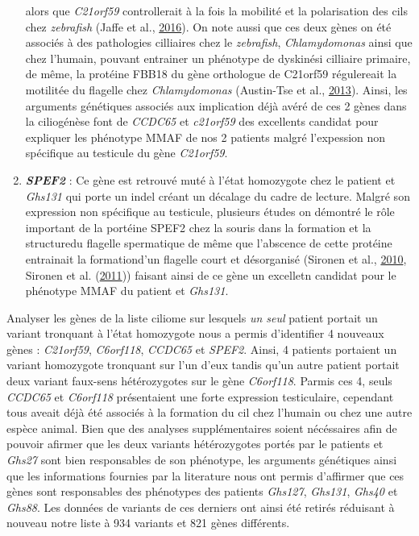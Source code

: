 \documentclass[12pt,twoside]{reedthesis}
\theoremstyle{definition}
\theoremstyle{definition}
\theoremstyle{remark}
\begin{document}
\begin{enumerate}
    alors que \emph{C21orf59} controllerait à la fois la mobilité et la
    polarisation des cils chez \emph{zebrafish} (Jaffe et al.,
    \protect\hyperlink{ref-Jaffe2016}{2016}). On note aussi que ces deux
    gènes on été associés à des pathologies cilliaires chez le
    \emph{zebrafish}, \emph{Chlamydomonas} ainsi que chez l'humain,
    pouvant entrainer un phénotype de dyskinési cilliaire primaire, de
    même, la protéine FBB18 du gène orthologue de C21orf59 régulereait la
    motilitée du flagelle chez \emph{Chlamydomonas} (Austin-Tse et al.,
    \protect\hyperlink{ref-Austin-Tse2013}{2013}). Ainsi, les arguments
    génétiques associés aux implication déjà avéré de ces 2 gènes dans la
    ciliogénèse font de \emph{CCDC65} et \emph{c21orf59} des excellents
    candidat pour expliquer les phénotype MMAF de nos 2 patients malgré
    l'expession non spécifique au testicule du gène \emph{C21orf59}.
  \item
    \textbf{\emph{SPEF2}} : Ce gène est retrouvé muté à l'état homozygote
    chez le patient et \emph{Ghs131} qui porte un indel créant un décalage
    du cadre de lecture. Malgré son expression non spécifique au
    testicule, plusieurs études on démontré le rôle important de la
    portéine SPEF2 chez la souris dans la formation et la structuredu
    flagelle spermatique de même que l'abscence de cette protéine
    entrainait la formationd'un flagelle court et désorganisé (Sironen et
    al., \protect\hyperlink{ref-Sironen2010}{2010}, Sironen et al.
    (\protect\hyperlink{ref-Sironen2011}{2011})) faisant ainsi de ce gène
    un excelletn candidat pour le phénotype MMAF du patient et
    \emph{Ghs131}.
  \end{enumerate}
  
  Analyser les gènes de la liste ciliome sur lesquels \emph{un seul}
  patient portait un variant tronquant à l'état homozygote nous a permis
  d'identifier 4 nouveaux gènes : \emph{C21orf59}, \emph{C6orf118},
  \emph{CCDC65} et \emph{SPEF2}. Ainsi, 4 patients portaient un variant
  homozygote tronquant sur l'un d'eux tandis qu'un autre patient portait
  deux variant faux-sens hétérozygotes sur le gène \emph{C6orf118}. Parmis
  ces 4, seuls \emph{CCDC65} et \emph{C6orf118} présentaient une forte
  expression testiculaire, cependant tous aveait déjà été associés à la
  formation du cil chez l'humain ou chez une autre espèce animal. Bien que
  des analyses supplémentaires soient nécéssaires afin de pouvoir afirmer
  que les deux variants hétérozygotes portés par le patients et
  \emph{Ghs27} sont bien responsables de son phénotype, les arguments
  génétiques ainsi que les informations fournies par la literature nous
  ont permis d'affirmer que ces gènes sont responsables des phénotypes des
  patients \emph{Ghs127}, \emph{Ghs131}, \emph{Ghs40} et \emph{Ghs88}. Les
  données de variants de ces derniers ont ainsi été retirés réduisant à
  nouveau notre liste à 934 variants et 821 gènes différents.
  
\end{document}
